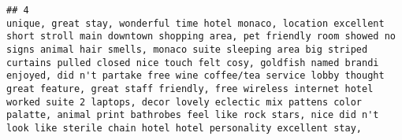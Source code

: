 \documentclass[
]{article}
\begin{document}
\begin{verbatim}
## 4                                                                                                                                                                                                                                                                                                                                                                                                                                                                                                                                                                                                                                                                                                                                                                                                                                                                                                                                                                                                                                                                                                                                  unique, great stay, wonderful time hotel monaco, location excellent short stroll main downtown shopping area, pet friendly room showed no signs animal hair smells, monaco suite sleeping area big striped curtains pulled closed nice touch felt cosy, goldfish named brandi enjoyed, did n't partake free wine coffee/tea service lobby thought great feature, great staff friendly, free wireless internet hotel worked suite 2 laptops, decor lovely eclectic mix pattens color palatte, animal print bathrobes feel like rock stars, nice did n't look like sterile chain hotel hotel personality excellent stay,  

\end{verbatim}
\end{document}
